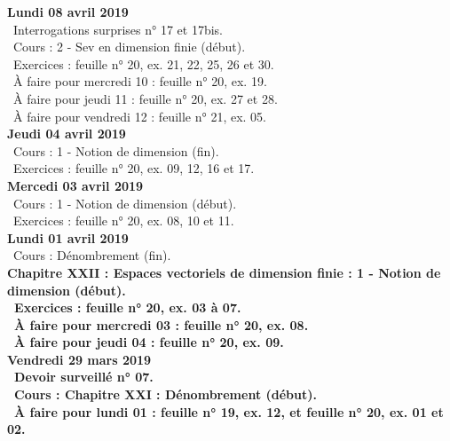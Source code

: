 \documentclass[12pt,a4paper]{article}
\begin{document}
\noindent\textbf{Lundi 08 avril 2019}\\
\bu\ Interrogations surprises n° 17 et 17bis.\\
\bu\ Cours : 2 - Sev en dimension finie (début).\\
\bu\ Exercices : feuille n° 20, ex. 21, 22, 25, 26 et 30.\\
\bu\ À faire pour mercredi 10 : feuille n° 20, ex. 19.\\
\bu\ À faire pour jeudi 11 : feuille n° 20, ex. 27 et 28.\\
\bu\ À faire pour vendredi 12 : feuille n° 21, ex. 05.\vspace{.4cm}\\

\noindent\textbf{Jeudi 04 avril 2019}\\
\bu\ Cours : 1 - Notion de dimension (fin).\\
\bu\ Exercices : feuille n° 20, ex. 09, 12, 16 et 17.\vspace{.4cm}\\

\noindent\textbf{Mercedi 03 avril 2019}\\
\bu\ Cours : 1 - Notion de dimension (début).\\
\bu\ Exercices : feuille n° 20, ex. 08, 10 et 11.\vspace{.4cm}\\

\noindent\textbf{Lundi 01 avril 2019}\\
\bu\ Cours : Dénombrement (fin).\\
\bf Chapitre XXII \rm : Espaces vectoriels de dimension finie  : 1 - Notion de dimension (début).\\
\bu\ Exercices : feuille n° 20, ex. 03 à 07.\\
\bu\ À faire pour mercredi 03 : feuille n° 20, ex. 08.\\
\bu\ À faire pour jeudi 04 : feuille n° 20, ex. 09.\vspace{.4cm}\\

\noindent\textbf{\bf Vendredi 29 mars 2019} \\
\bu\ Devoir surveillé n° 07.\\
\bu\ Cours : \bf Chapitre XXI \rm : Dénombrement (début).\\
\bu\ À faire pour lundi 01 : feuille n° 19, ex. 12, et feuille n° 20, ex. 01 et 02.\vspace{.4cm}\\
\end{document}
